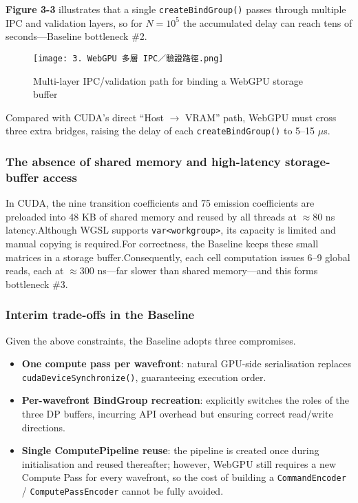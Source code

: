 \documentclass[PhD]{PHlab-thesis}
\begin{document}
\textbf{Figure 3-3} illustrates that a single \texttt{createBindGroup()} passes through multiple IPC and validation layers, so for $N=10^5$ the accumulated delay can reach tens of seconds—Baseline bottleneck \#2.

\begin{figure}[htbp]
    \centering
    \texttt{[image: 3. WebGPU 多層 IPC／驗證路徑.png]}
    \caption{Multi-layer IPC/validation path for binding a WebGPU storage buffer}
    \label{fig:webgpu-ipc-validation}
\end{figure}


Compared with CUDA’s direct ``Host $\rightarrow$ VRAM'' path, WebGPU must cross three extra bridges, raising the delay of each \texttt{createBindGroup()} to 5–15 $\mu$s.

\subsubsection{The absence of shared memory and high-latency storage-buffer access}
In CUDA, the nine transition coefficients and 75 emission coefficients are preloaded into 48 KB of shared memory and reused by all threads at $\approx$80 ns latency.Although WGSL supports \texttt{var<workgroup>}, its capacity is limited and manual copying is required.For correctness, the Baseline keeps these small matrices in a storage buffer.Consequently, each cell computation issues 6–9 global reads, each at $\approx$300 ns—far slower than shared memory—and this forms bottleneck \#3.

\subsubsection{Interim trade-offs in the Baseline}
Given the above constraints, the Baseline adopts three compromises.
\begin{itemize}
    \item \textbf{One compute pass per wavefront}: natural GPU-side serialisation replaces \texttt{cudaDeviceSynchronize()}, guaranteeing execution order.
    \item \textbf{Per-wavefront BindGroup recreation}: explicitly switches the roles of the three DP buffers, incurring API overhead but ensuring correct read/write directions.
    \item \textbf{Single ComputePipeline reuse}: the pipeline is created once during initialisation and reused thereafter; however, WebGPU still requires a new Compute Pass for every wavefront, so the cost of building a \texttt{CommandEncoder} / \texttt{ComputePassEncoder} cannot be fully avoided.
\end{itemize}
\end{document}
